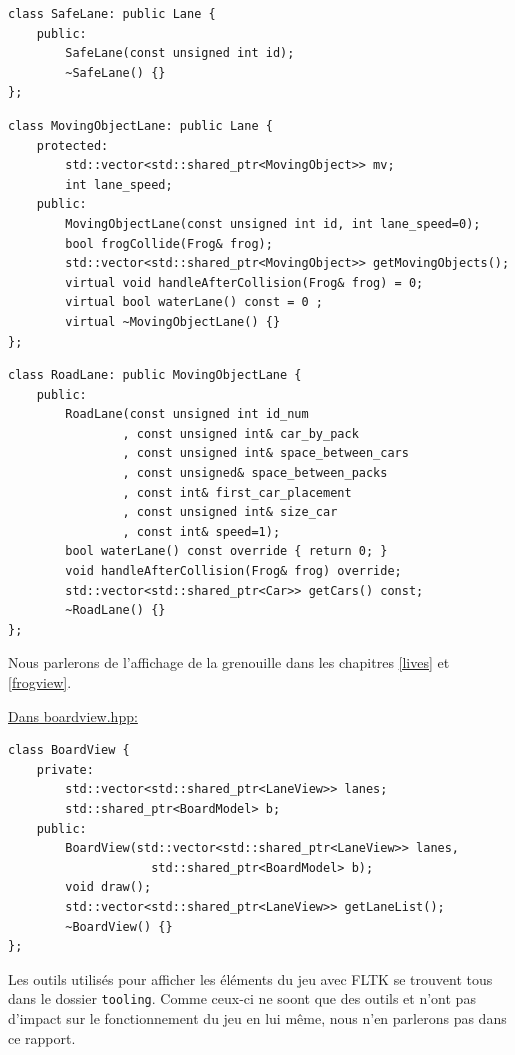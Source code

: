 \documentclass[a4paper, 12pt]{article}
\begin{document}
\begin{lstlisting}
class SafeLane: public Lane {
    public:
        SafeLane(const unsigned int id);
        ~SafeLane() {}
};
\end{lstlisting}

\begin{lstlisting}
class MovingObjectLane: public Lane {
    protected:
        std::vector<std::shared_ptr<MovingObject>> mv;
        int lane_speed;
    public:
        MovingObjectLane(const unsigned int id, int lane_speed=0);
        bool frogCollide(Frog& frog);
        std::vector<std::shared_ptr<MovingObject>> getMovingObjects();
        virtual void handleAfterCollision(Frog& frog) = 0;
        virtual bool waterLane() const = 0 ;
        virtual ~MovingObjectLane() {}
};   
\end{lstlisting}

\begin{lstlisting}
class RoadLane: public MovingObjectLane {
    public:
        RoadLane(const unsigned int id_num
                , const unsigned int& car_by_pack
                , const unsigned int& space_between_cars
                , const unsigned& space_between_packs
                , const int& first_car_placement
                , const unsigned int& size_car
                , const int& speed=1);
        bool waterLane() const override { return 0; }
        void handleAfterCollision(Frog& frog) override;
        std::vector<std::shared_ptr<Car>> getCars() const;
        ~RoadLane() {}
};
\end{lstlisting}

Nous parlerons de l'affichage de la grenouille dans les chapitres \ref{lives} et \ref{frogview}.

\underline{Dans boardview.hpp:} \hspace{0.5cm}

\begin{lstlisting}
class BoardView {
    private:
        std::vector<std::shared_ptr<LaneView>> lanes;
        std::shared_ptr<BoardModel> b;
    public:
        BoardView(std::vector<std::shared_ptr<LaneView>> lanes,
                    std::shared_ptr<BoardModel> b);
        void draw();
        std::vector<std::shared_ptr<LaneView>> getLaneList();
        ~BoardView() {}
};
\end{lstlisting}

Les outils utilisés pour afficher les éléments du jeu avec FLTK se trouvent tous 
dans le dossier \texttt{tooling}. 
Comme ceux-ci ne soont que des outils et n'ont pas d'impact sur le fonctionnement 
du jeu en lui même, 
nous n'en parlerons pas dans ce rapport.
\end{document}
